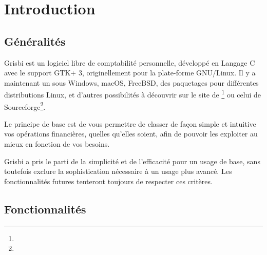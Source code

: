 
\chapter{Introduction\label{introduction}}


\section{Généralités\label{introduction-general}}


Grisbi est un \gls{logiciel libre} de comptabilité personnelle, développé en \gls{Langage C} avec le support \gls{GTK}+ 3, originellement pour la plate-forme \gls{GNU/Linux}. Il y a maintenant un  sous \gls{Windows}, \gls{macOS}, FreeBSD, des paquetages pour différentes \gls{distributions Linux}, et d'autres possibilités à découvrir sur le site de \footnote{\urlGrisbi{}} ou celui de {Sourceforge}\footnote{\urlSourceForge{}}.

Le principe de base est de vous permettre de classer de façon simple et intuitive vos opérations financières, quelles qu’elles soient, afin de pouvoir les exploiter au mieux en fonction de vos besoins.

Grisbi a pris le parti de la simplicité et de l'efficacité pour un usage de
base, sans toutefois exclure la sophistication nécessaire à un usage plus avancé. Les fonctionnalités futures tenteront toujours de respecter ces critères.


\section{Fonctionnalités\label{introduction-features}}


